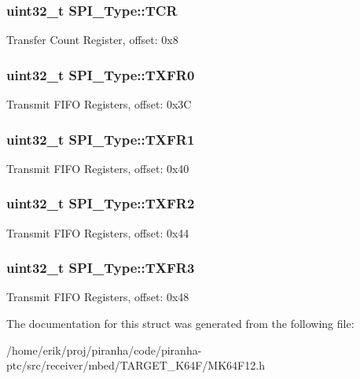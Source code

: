 \subsubsection[{\texorpdfstring{T\+CR}{TCR}}]{ uint32\+\_\+t S\+P\+I\+\_\+\+Type\+::\+T\+CR}\hypertarget{structSPI__Type_af7eab4d0bc295e978e3c0c28d7129481}{}\label{structSPI__Type_af7eab4d0bc295e978e3c0c28d7129481}
Transfer Count Register, offset\+: 0x8 
\subsubsection[{\texorpdfstring{T\+X\+F\+R0}{TXFR0}}]{ uint32\+\_\+t S\+P\+I\+\_\+\+Type\+::\+T\+X\+F\+R0}\hypertarget{structSPI__Type_a249653bf4e8d64e2c4c5936421ea9927}{}\label{structSPI__Type_a249653bf4e8d64e2c4c5936421ea9927}
Transmit F\+I\+FO Registers, offset\+: 0x3C 
\subsubsection[{\texorpdfstring{T\+X\+F\+R1}{TXFR1}}]{ uint32\+\_\+t S\+P\+I\+\_\+\+Type\+::\+T\+X\+F\+R1}\hypertarget{structSPI__Type_abb8a5ba4a6ec647e27fa59f3d9657dc6}{}\label{structSPI__Type_abb8a5ba4a6ec647e27fa59f3d9657dc6}
Transmit F\+I\+FO Registers, offset\+: 0x40 
\subsubsection[{\texorpdfstring{T\+X\+F\+R2}{TXFR2}}]{ uint32\+\_\+t S\+P\+I\+\_\+\+Type\+::\+T\+X\+F\+R2}\hypertarget{structSPI__Type_a0f0d6e3942d20c38cdf19ef8c48116d2}{}\label{structSPI__Type_a0f0d6e3942d20c38cdf19ef8c48116d2}
Transmit F\+I\+FO Registers, offset\+: 0x44 
\subsubsection[{\texorpdfstring{T\+X\+F\+R3}{TXFR3}}]{ uint32\+\_\+t S\+P\+I\+\_\+\+Type\+::\+T\+X\+F\+R3}\hypertarget{structSPI__Type_a67d77705e336870c3747e28d1f549b1d}{}\label{structSPI__Type_a67d77705e336870c3747e28d1f549b1d}
Transmit F\+I\+FO Registers, offset\+: 0x48 

The documentation for this struct was generated from the following file\+:\begin{DoxyCompactItemize}
\item 
/home/erik/proj/piranha/code/piranha-\/ptc/src/receiver/mbed/\+T\+A\+R\+G\+E\+T\+\_\+\+K64\+F/M\+K64\+F12.\+h\end{DoxyCompactItemize}
